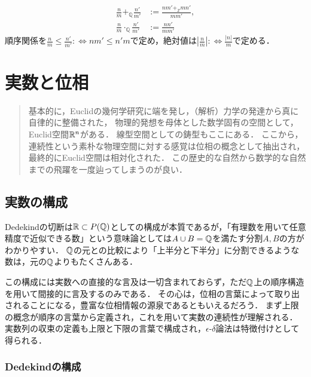 \documentclass[uplatex,dvipdfmx]{jsreport}
\begin{document}
\begin{definition}
    \begin{align*}
        \frac{n}{m} +_\mathbb{Q} \frac{n'}{m'} &:= \frac{nm'+_\mathbb{Z}mn'}{mm'},\\
        \frac{n}{m}\cdot_\mathbb{Q}\frac{n'}{m'} &:= \frac{nn'}{mm'}
    \end{align*}
    順序関係を$\frac{n}{m}\le\frac{n'}{m'}:\Leftrightarrow nm'\le n'm$で定め，絶対値は$\left| \frac{n}{m} \right|:\Leftrightarrow \frac{|n|}{m}$で定める．
\end{definition}

\chapter{実数と位相}

\begin{quotation}
    基本的に，Euclidの幾何学研究に端を発し，（解析）力学の発達から真に自律的に整備された，
    物理的発想を母体とした数学固有の空間として，Euclid空間$\mathbb{R}^n$がある．
    線型空間としての鋳型もここにある．
    ここから，連続性という素朴な物理空間に対する感覚は位相の概念として抽出され，最終的にEuclid空間は相対化された．
    この歴史的な自然から数学的な自然までの飛躍を一度辿ってしまうのが良い．
\end{quotation}

\section{実数の構成}

\begin{screen}
    Dedekindの切断は$\mathbb{R}\subset P(\mathbb{Q})$としての構成が本質であるが，「有理数を用いて任意精度で近似できる数」という意味論としては$A\cup B=\mathbb{Q}$を満たす分割$A,B$の方がわかりやすい．
    $\mathbb{Q}$の元との比較により「上半分と下半分」に分割できるような数は，元の$\mathbb{Q}$よりもたくさんある．

    この構成には実数への直接的な言及は一切含まれておらず，ただ$\mathbb{Q}$上の順序構造を用いて間接的に言及するのみである．
    その心は，位相の言葉によって取り出されることになる，豊富な位相情報の源泉であるともいえるだろう．
    まず上限の概念が順序の言葉から定義され，これを用いて実数の連続性が理解される．
    実数列の収束の定義も上限と下限の言葉で構成され，$\epsilon$-$\delta$論法は特徴付けとして得られる．
\end{screen}

\subsection{Dedekindの構成}
\end{document}
